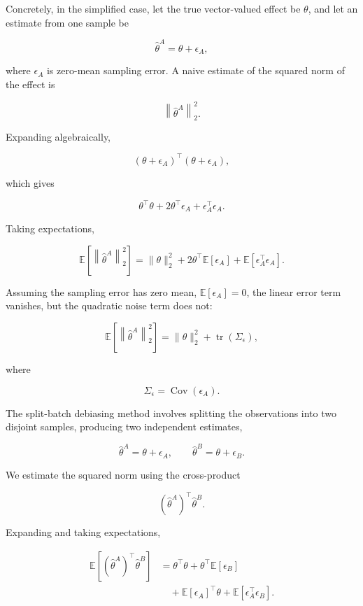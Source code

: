 \documentclass[11pt]{article}
\begin{document}
Concretely, in the simplified case, let the true vector-valued effect be
$\theta$, and let an estimate from one sample be

\[
\hat{\theta}^{A} = \theta + \epsilon_A,
\]

where $\epsilon_A$ is zero-mean sampling error. A naive estimate of the
squared norm of the effect is

\[
\left\|\hat{\theta}^{A}\right\|_2^2.
\]

Expanding algebraically,

\[
\left(\theta + \epsilon_A\right)^\top
\left(\theta + \epsilon_A\right),
\]

which gives

\[
\theta^\top\theta
+ 2\theta^\top\epsilon_A
+ \epsilon_A^\top\epsilon_A.
\]

Taking expectations,

\[
\mathbb{E}\left[
\left\|\hat{\theta}^{A}\right\|_2^2
\right]
=
\|\theta\|_2^2
+ 2\theta^\top\mathbb{E}[\epsilon_A]
+ \mathbb{E}\left[\epsilon_A^\top\epsilon_A\right].
\]

Assuming the sampling error has zero mean,
$\mathbb{E}[\epsilon_A]=0$, the linear error term vanishes, but the
quadratic noise term does not:

\[
\mathbb{E}\left[
\left\|\hat{\theta}^{A}\right\|_2^2
\right]
=
\|\theta\|_2^2
+
\operatorname{tr}\left(\Sigma_{\epsilon}\right),
\]

where

\[
\Sigma_{\epsilon}
=
\operatorname{Cov}(\epsilon_A).
\]

The split-batch debiasing method involves splitting the observations into two disjoint samples, producing two independent estimates,

\[
\hat{\theta}^{A} = \theta + \epsilon_A,
\qquad
\hat{\theta}^{B} = \theta + \epsilon_B.
\]

We estimate the squared norm using the cross-product

\[
\left(\hat{\theta}^{A}\right)^\top
\hat{\theta}^{B}.
\]

Expanding and taking expectations,

\[
\begin{aligned}
\mathbb{E}\left[
\left(\hat{\theta}^{A}\right)^\top
\hat{\theta}^{B}
\right]
&=
\theta^\top\theta
+ \theta^\top\mathbb{E}[\epsilon_B]\\
&\quad+ \mathbb{E}[\epsilon_A]^\top\theta
+ \mathbb{E}\left[\epsilon_A^\top\epsilon_B\right].
\end{aligned}
\]
\end{document}
